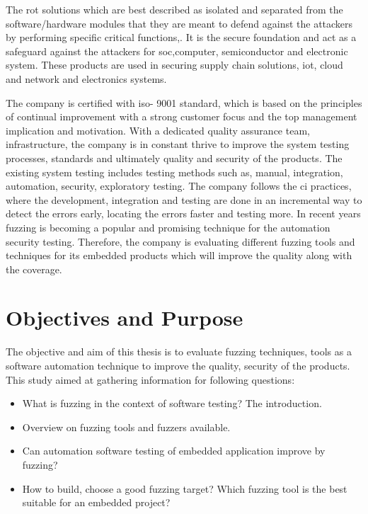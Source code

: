 The \gls{rot} solutions which are best described as isolated and separated from the
software/hardware modules that they are meant to defend against the attackers by performing specific critical
functions\cite{Hardware2:online},\cite{RootsofT78:online}. It is the secure foundation and act as a
safeguard against the attackers for \gls{soc},computer, semiconductor and electronic system.
These products are used in securing supply chain solutions, \gls{iot}, cloud and network and
electronics systems.\newline


The company is certified with \gls{iso}- 9001 standard, which is based on the principles of
continual improvement with a strong customer focus and the top management implication and
motivation\cite{ISOISO9048:online}. With a dedicated quality assurance team, infrastructure, the company
is in constant thrive to improve the system testing processes, standards and ultimately
quality and security of the products. The existing system testing includes testing methods such as, manual,
integration, automation, security, exploratory testing. The company follows the \gls{ci} practices,
where the development, integration and testing are done in an incremental way to detect
the errors early, locating the errors faster and testing more. In recent years fuzzing is becoming a
popular and promising technique for the automation security testing. Therefore, the company is
evaluating different fuzzing tools and techniques for its embedded products which will improve the
quality along with the coverage.\newline


\section{Objectives and Purpose}

The objective and aim of this thesis is to evaluate fuzzing techniques, tools as a software automation
technique to improve the quality, security of the products. This study aimed at gathering information
for following questions:\newline

\begin{itemize}
        \item What is fuzzing in the context of software testing? The introduction.
        \item Overview on fuzzing tools and fuzzers available.
        \item Can automation software testing of embedded application improve by fuzzing?
        \item How to build, choose a good fuzzing target? Which fuzzing tool is the best suitable for
        an embedded project?
\end{itemize}


